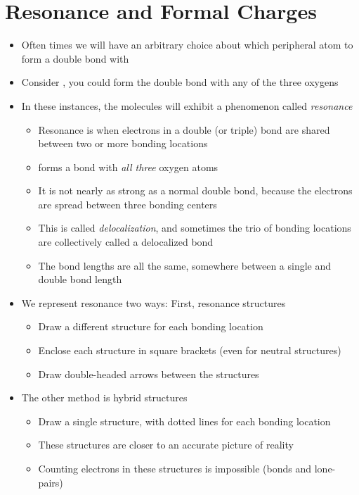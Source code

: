 \documentclass[12pt, openany, letterpaper]{memoir}
\begin{document}
\section{Resonance and Formal Charges}
\begin{itemize}
	\item Often times we will have an arbitrary choice about which peripheral atom to form a double bond with
	\item Consider , you could form the double bond with any of the three oxygens
	\item In these instances, the molecules will exhibit a phenomenon called \emph{resonance}
	      \begin{itemize}
		      \item Resonance is when electrons in a double (or triple) bond are shared between two or more bonding locations
		      \item {} forms a bond with \emph{all three} oxygen atoms
		      \item It is not nearly as strong as a normal double bond, because the electrons are spread between three bonding centers
		      \item This is called \emph{delocalization}, and sometimes the trio of bonding locations are collectively called a delocalized bond
		      \item The bond lengths are all the same, somewhere between a single and double bond length
	      \end{itemize}
	\item We represent resonance two ways: First, resonance structures
	      \begin{itemize}
		      \item Draw a different structure for each bonding location
		      \item Enclose each structure in square brackets (even for neutral structures)
		      \item Draw double-headed arrows between the structures
	      \end{itemize}
	\item The other method is hybrid structures
	      \begin{itemize}
		      \item Draw a single structure, with dotted lines for each bonding location
		      \item These structures are closer to an accurate picture of reality
		      \item Counting electrons in these structures is impossible (bonds and lone-pairs)
	      \end{itemize}


\end{itemize}
\end{document}

